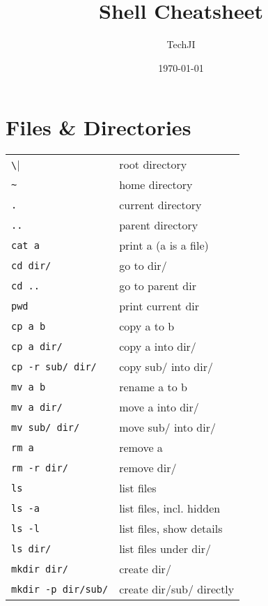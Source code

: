 \documentclass[a4paper, twocolumn]{article}
\title{Shell Cheatsheet}
\author{TechJI}
\date{\today}
\renewcommand{\tt}{\texttt}
\begin{document}
\maketitle
\section{Files \& Directories}
\begin{tabular}{ll}
    \verb|\|                & root directory                   \\
    \verb|~|                & home directory                   \\
    \verb|.|                & current directory                   \\
    \verb|..|               & parent directory                   \\
    \tt{cat a}              & print a (a is a file)                 \\
    \tt{cd dir/}            & go to dir/                            \\
    \tt{cd ..}              & go to parent dir                      \\
    \tt{pwd}                & print current dir                     \\
    \tt{cp a b}             & copy a to b                           \\
    \tt{cp a dir/}          & copy a into dir/                      \\
    \tt{cp -r sub/ dir/}    & copy sub/ into dir/                   \\
    \tt{mv a b}             & rename a to b                         \\
    \tt{mv a dir/}          & move a into dir/                      \\
    \tt{mv sub/ dir/}       & move sub/ into dir/                   \\
    \tt{rm a}               & remove a                              \\
    \tt{rm -r dir/}         & remove dir/                           \\
    \tt{ls}                 & list files                            \\
    \tt{ls -a}              & list files, incl. hidden              \\
    \tt{ls -l}              & list files, show details              \\
    \tt{ls dir/}            & list files under dir/                 \\
    \tt{mkdir dir/}         & create dir/                           \\
    \tt{mkdir -p dir/sub/}  & create dir/sub/ directly
\end{tabular}
\end{document}
